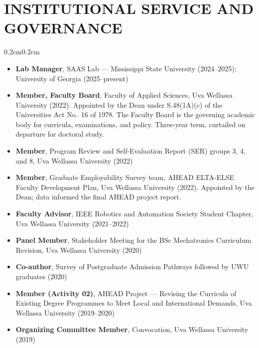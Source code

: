 \documentclass[10pt, letterpaper]{article}
\newenvironment{highlights}{%
    \begin{itemize}[topsep=0.08cm, parsep=0.08cm, partopsep=0pt,
                    itemsep=0pt, leftmargin=0.4cm + 10pt]
}{\end{itemize}}
\newenvironment{onecolentry}{%
    \begin{adjustwidth}{0.2cm}{0.2cm}
}{\end{adjustwidth}}
\begin{document}
\section{INSTITUTIONAL SERVICE AND GOVERNANCE}
\vspace{0.08cm}
\begin{onecolentry}
    \begin{highlights}
        \item \textbf{Lab Manager}, SAAS Lab --- Mississippi State University
              (2024--2025); University of Georgia (2025--present)
        \item \textbf{Member, Faculty Board}, Faculty of Applied Sciences,
              Uva Wellassa University (2022). Appointed by the Dean under
              S.48(1A)(c) of the Universities Act No.~16 of 1978. The Faculty Board is
              the governing academic body for curricula, examinations, and policy.
              Three-year term, curtailed on departure for doctoral study.
        \item \textbf{Member}, Program Review and Self-Evaluation Report (SER) groups
              3, 4, and 8, Uva Wellassa University (2022)
        \item \textbf{Member}, Graduate Employability Survey team, AHEAD ELTA-ELSE
              Faculty Development Plan, Uva Wellassa University (2022).
              Appointed by the Dean; data informed the final AHEAD project report.
        \item \textbf{Faculty Advisor}, IEEE Robotics and Automation Society Student
              Chapter, Uva Wellassa University (2021--2022)
        \item \textbf{Panel Member}, Stakeholder Meeting for the BSc Mechatronics
              Curriculum Revision, Uva Wellassa University (2020)
        \item \textbf{Co-author}, Survey of Postgraduate Admission Pathways followed by
              UWU graduates (2020)
        \item \textbf{Member (Activity 02)}, AHEAD Project --- Revising the Curricula
              of Existing Degree Programmes to Meet Local and International Demands,
              Uva Wellassa University (2019--2020)
        \item \textbf{Organizing Committee Member}, Convocation, Uva Wellassa
              University (2019)
    \end{highlights}
\end{onecolentry}
\vspace{0.10cm}
\end{document}
